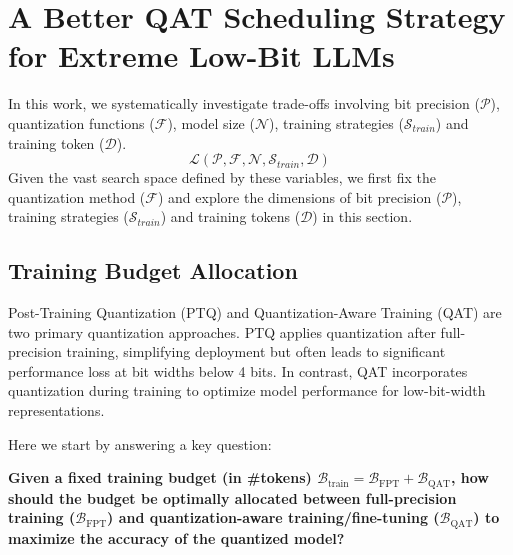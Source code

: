 \section{A Better QAT Scheduling Strategy for Extreme Low-Bit LLMs}
\label{sec:scalinglaw}

In this work, we systematically investigate trade-offs involving bit precision ($\mathcal{P}$), quantization functions ($\mathcal{F}$), model size ($\mathcal{N}$), training strategies ($\mathcal{S}_{train}$) and training token ($\mathcal{D}$). 
\begin{equation}
\mathcal{L}(\mathcal{P}, \mathcal{F}, \mathcal{N}, \mathcal{S}_{train}, \mathcal{D}) 
\end{equation}
Given the vast search space defined by these variables, we first fix the quantization method ($\mathcal{F}$) and explore the dimensions of bit precision ($\mathcal{P}$), training strategies ($\mathcal{S}_{train}$) and training tokens ($\mathcal{D}$) in this section.





\subsection{Training Budget Allocation}

Post-Training Quantization (PTQ) and Quantization-Aware Training (QAT) are two primary quantization approaches. PTQ applies quantization after full-precision training, simplifying deployment but often leads to significant performance loss at bit widths below 4 bits. In contrast, QAT incorporates quantization during training to optimize model performance for low-bit-width representations.

Here we start by answering a key question:

\textbf{Given a fixed training budget (in \#tokens) $\mathcal{B}_{\text{train}} = \mathcal{B}_{\text{FPT}} + \mathcal{B}_{\text{QAT}}$, how should the budget be optimally allocated between full-precision training ($\mathcal{B}_{\text{FPT}}$) and quantization-aware training/fine-tuning ($\mathcal{B}_{\text{QAT}}$) to maximize the accuracy of the quantized model?}

